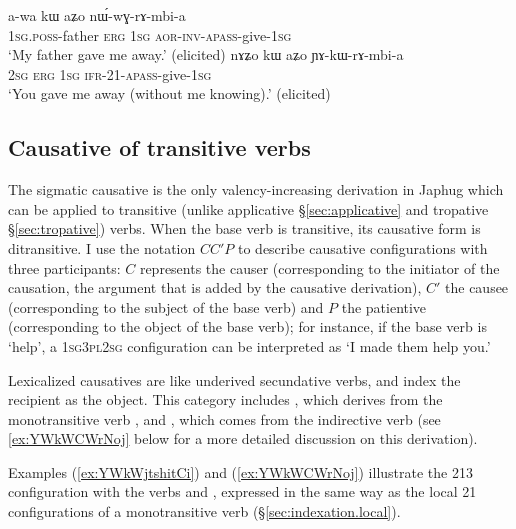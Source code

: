 \begin{exe}
	\ex 
	\begin{xlist}
		\ex \label{ex:nWwGrAmbia}
		\gll  a-wa kɯ aʑo nɯ́-wɣ-rɤ-mbi-a \\
		\textsc{1sg}.\textsc{poss}-father \textsc{erg} \textsc{1sg} \textsc{aor}-\textsc{inv}-\textsc{apass}-give-\textsc{1sg} \\
		\glt `My father gave me away.' (elicited)
		\ex \label{ex:YAkWrAmbia}
		\gll nɤʑo kɯ aʑo ɲɤ-kɯ-rɤ-mbi-a \\
		\textsc{2sg} \textsc{erg} \textsc{1sg} \textsc{ifr}-2\fl{}1-\textsc{apass}-give-\textsc{1sg} \\
		\glt `You gave me away (without me knowing).' (elicited)
	\end{xlist}
\end{exe}

\subsection{Causative of transitive verbs} \label{sec:ditransitive.causative}
The sigmatic causative is the only valency-increasing derivation in Japhug which can be applied to transitive (unlike applicative §\ref{sec:applicative} and tropative §\ref{sec:tropative}) verbs. When the base verb is transitive, its causative form is ditransitive. I use the notation $C$\fl{}$C'$\fl{}$P$ to describe causative configurations with three participants: $C$ represents the causer (corresponding to the initiator of the causation, the argument that is added by the causative derivation), $C'$ the causee (corresponding to the subject of the base verb) and $P$ the patientive (corresponding to the object of the base verb); for instance, if the base verb is `help', a \textsc{1sg}\fl{}\textsc{3pl}\fl{}\textsc{2sg} configuration can be interpreted as `I made them help you.'

Lexicalized causatives are like underived secundative verbs, and index the recipient as the object. This category includes , which derives from the monotransitive verb , and , which comes from the indirective verb  (see \ref{ex:YWkWCWrNoj} below for a more detailed discussion on this derivation). 

Examples (\ref{ex:YWkWjtshitCi}) and (\ref{ex:YWkWCWrNoj}) illustrate the 2\fl{}1\fl{}3 configuration with the verbs  and , expressed in the same way as the local 2\fl{}1 configurations of a monotransitive verb (§\ref{sec:indexation.local}).

